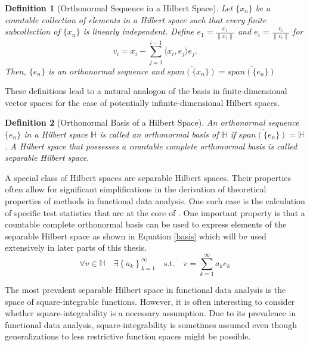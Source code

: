 \documentclass[12pt, a4paper]{article}
\theoremstyle{MAstyle} \newtheorem{assumption}{Assumption}[section]
\theoremstyle{MAstyle} \newtheorem{definition}{Definition}[section]
\theoremstyle{MAstyle} \newtheorem{theorem}{Theorem}[section]
\begin{document}
			\begin{definition}[Orthonormal Sequence in a Hilbert Space]
				Let $\{x_n\}$ be a countable collection of elements in a Hilbert space such that every finite subcollection of $\{x_n\}$ is linearly independent. Define $e_1 = \frac{x_1}{\| x_1 \|}$ and $e_i = \frac{v_i}{\| v_i \|}$ for 
				$$v_i = x_i - \sum_{j = 1}^{i - 1}\langle x_i, e_j\rangle e_j.$$
				Then, $\{e_n\}$ is an orthonormal sequence and $\overline{{\textit{span}\left(\{x_n\}\right)}} = \overline{{\textit{span}\left(\{e_n\}\right)}}$
			\end{definition}
			These definitions lead to a natural analogon of the basis in finite-dimensional vector spaces for the case of potentially infinite-dimensional Hilbert spaces.
			\begin{definition}[Orthonormal Basis of a Hilbert Space]
				An orthonormal sequence $\{e_n\}$ in a Hilbert space $\mathbb{H}$ is called an orthonormal basis of $\mathbb{H}$ if $\overline{{\textit{span}\left(\{e_n\}\right)}} = \mathbb{H}$. 
				A Hilbert space that possesses a countable complete orthonormal basis is called separable Hilbert space.
			\end{definition}
			
			A special class of Hilbert spaces are separable Hilbert spaces. Their properties often allow for significant simplifications in the derivation of theoretical properties of methods in functional data analysis. One such case is the calculation of specific test statistics that are at the core of \cite{bugni_permutation_2021}. One important property is that a countable complete orthonormal basis can be used to express elements of the separable Hilbert space as shown in Equation \ref{basis} which will be used extensively in later parts of this thesis.
			\begin{equation}\label{basis}
				\forall v \in \mathbb{H} \quad \exists \left\{a_k\right\}_{k = 1}^{\infty} \quad \text{s.t.} \quad v = \sum_{k = 1}^{\infty} a_k e_k
			\end{equation}
			
			The most prevalent separable Hilbert space in functional data analysis is the space of square-integrable functions. However, it is often interesting to consider whether square-integrability is a necessary assumption. Due to its prevalence in functional data analysis, square-integrability is sometimes assumed even though generalizations to less restrictive function spaces might be possible.
			
\end{document}
